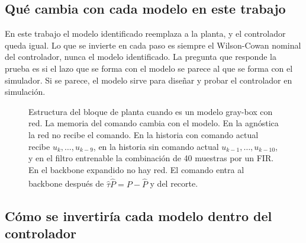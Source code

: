 \documentclass[10pt,a4paper]{article}
\newcommand{\bh}{\hat\beta}
\begin{document}
\subsection{Qué cambia con cada modelo en este trabajo}

En este trabajo el modelo identificado reemplaza a la planta, y el controlador queda igual. Lo que se invierte en cada paso es siempre el Wilson-Cowan nominal del controlador, nunca el modelo identificado. La pregunta que responde la prueba es si el lazo que se forma con el modelo se parece al que se forma con el simulador. Si se parece, el modelo sirve para diseñar y probar el controlador en simulación.

\begin{figure}[H]
\centering
{}
\caption{Estructura del bloque de planta cuando es un modelo gray-box con red. La memoria del comando cambia con el modelo. En la agnóstica la red no recibe el comando. En la historia con comando actual recibe $u_k, \dots, u_{k-9}$, en la historia sin comando actual $u_{k-1}, \dots, u_{k-10}$, y en el filtro entrenable la combinación de 40 muestras por un FIR. En el backbone expandido no hay red. El comando entra al backbone después de $\hat\tau\dot{\hat P} = P - \hat P$ y del recorte.}
\label{fig:planta}
\end{figure}

\subsection{Cómo se invertiría cada modelo dentro del controlador}
\end{document}
